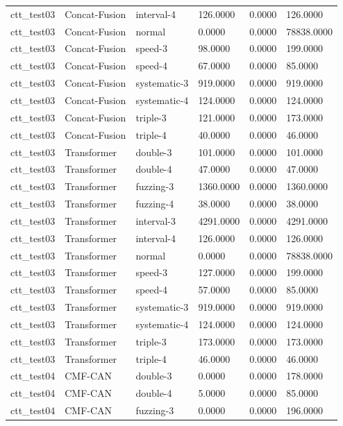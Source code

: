 \begin{tabular}{llllll}
ctt_test03 & Concat-Fusion & interval-4 & 126.0000 & 0.0000 & 126.0000 \\
ctt_test03 & Concat-Fusion & normal & 0.0000 & 0.0000 & 78838.0000 \\
ctt_test03 & Concat-Fusion & speed-3 & 98.0000 & 0.0000 & 199.0000 \\
ctt_test03 & Concat-Fusion & speed-4 & 67.0000 & 0.0000 & 85.0000 \\
ctt_test03 & Concat-Fusion & systematic-3 & 919.0000 & 0.0000 & 919.0000 \\
ctt_test03 & Concat-Fusion & systematic-4 & 124.0000 & 0.0000 & 124.0000 \\
ctt_test03 & Concat-Fusion & triple-3 & 121.0000 & 0.0000 & 173.0000 \\
ctt_test03 & Concat-Fusion & triple-4 & 40.0000 & 0.0000 & 46.0000 \\
ctt_test03 & Transformer & double-3 & 101.0000 & 0.0000 & 101.0000 \\
ctt_test03 & Transformer & double-4 & 47.0000 & 0.0000 & 47.0000 \\
ctt_test03 & Transformer & fuzzing-3 & 1360.0000 & 0.0000 & 1360.0000 \\
ctt_test03 & Transformer & fuzzing-4 & 38.0000 & 0.0000 & 38.0000 \\
ctt_test03 & Transformer & interval-3 & 4291.0000 & 0.0000 & 4291.0000 \\
ctt_test03 & Transformer & interval-4 & 126.0000 & 0.0000 & 126.0000 \\
ctt_test03 & Transformer & normal & 0.0000 & 0.0000 & 78838.0000 \\
ctt_test03 & Transformer & speed-3 & 127.0000 & 0.0000 & 199.0000 \\
ctt_test03 & Transformer & speed-4 & 57.0000 & 0.0000 & 85.0000 \\
ctt_test03 & Transformer & systematic-3 & 919.0000 & 0.0000 & 919.0000 \\
ctt_test03 & Transformer & systematic-4 & 124.0000 & 0.0000 & 124.0000 \\
ctt_test03 & Transformer & triple-3 & 173.0000 & 0.0000 & 173.0000 \\
ctt_test03 & Transformer & triple-4 & 46.0000 & 0.0000 & 46.0000 \\
ctt_test04 & CMF-CAN & double-3 & 0.0000 & 0.0000 & 178.0000 \\
ctt_test04 & CMF-CAN & double-4 & 5.0000 & 0.0000 & 85.0000 \\
ctt_test04 & CMF-CAN & fuzzing-3 & 0.0000 & 0.0000 & 196.0000 \\

\end{tabular}
